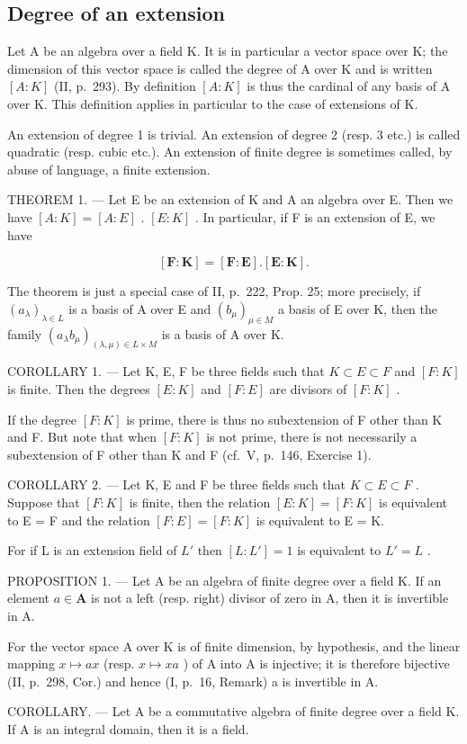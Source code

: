 \subsection{Degree of an extension}

Let A be an algebra over a field K. It is in particular a vector space over K; the dimension of this vector space is called the degree of A over K and is written \([A:K]\) (II, p.~293). By definition \([A:K]\) is thus the cardinal of any basis of A over K. This definition applies in particular to the case of extensions of K.

An extension of degree 1 is trivial. An extension of degree 2 (resp. 3 etc.) is called quadratic (resp. cubic etc.). An extension of finite degree is sometimes called, by abuse of language, a finite extension.

THEOREM 1. --- Let E be an extension of K and A an algebra over E. Then we have \([A:K]=[A:E]\) . \([E:K]\) . In particular, if F is an extension of E, we have

\[
[ \mathbf {F}: \mathbf {K} ] = [ \mathbf {F}: \mathbf {E} ]. [ \mathbf {E}: \mathbf {K} ].\tag{1}
\]

The theorem is just a special case of II, p.~222, Prop. 25; more precisely, if \((a_{\lambda})_{\lambda \in L}\) is a basis of A over E and \((b_{\mu})_{\mu \in M}\) a basis of E over K, then the family \((a_{\lambda}b_{\mu})_{(\lambda ,\mu)\in L\times M}\) is a basis of A over K.

COROLLARY 1. --- Let K, E, F be three fields such that \(K \subset E \subset F\) and \([F:K]\) is finite. Then the degrees \([E:K]\) and \([F:E]\) are divisors of \([F:K]\) .

If the degree \([F:K]\) is prime, there is thus no subextension of F other than K and F. But note that when \([F:K]\) is not prime, there is not necessarily a subextension of F other than K and F (cf.~V, p.~146, Exercise 1).

COROLLARY 2. --- Let K, E and F be three fields such that \(K \subset E \subset F\) . Suppose that \([F:K]\) is finite, then the relation \([E:K] = [F:K]\) is equivalent to E = F and the relation \([F:E] = [F:K]\) is equivalent to E = K.

For if L is an extension field of \(L'\) then \([L:L'] = 1\) is equivalent to \(L' = L\) .

PROPOSITION 1. --- Let A be an algebra of finite degree over a field K. If an element \(a \in \mathbf{A}\) is not a left (resp. right) divisor of zero in A, then it is invertible in A.

For the vector space A over K is of finite dimension, by hypothesis, and the linear mapping \(x \mapsto ax\) (resp. \(x \mapsto xa\) ) of A into A is injective; it is therefore bijective (II, p.~298, Cor.) and hence (I, p.~16, Remark) a is invertible in A.

COROLLARY. --- Let A be a commutative algebra of finite degree over a field K. If A is an integral domain, then it is a field.

